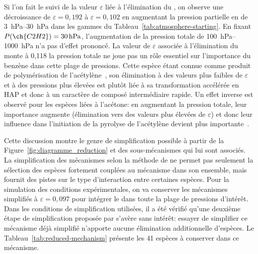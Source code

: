 Si l'on fait le suivi de la valeur $\varepsilon$ liée à l'élimination du , on observe une décroissance de $\varepsilon=0,192$ à $\varepsilon=0,102$ en augmentant la pression partielle en  de \SIrange{3}{30}{\hecto\pascal} dans les gammes du Tableau~\ref{tab:atmosphere-starting}. En fixant $P(\ch{C2H2})=\SI{30}{\hecto\pascal}$, l'augmentation de la pression totale de \SIrange{100}{1000}{\hecto\pascal} n'a pas d'effet prononcé. La valeur de $\varepsilon$ associée à l'élimination du  monte à 0,118 \textemdash{} la pression totale ne joue pas un rôle essentiel sur l'importance du benzène dans cette plage de pressions. Cette espèce étant connue comme produit de polymérisation de l'acétylène~\cite{Norinaga2005}, son élimination à des valeurs plus faibles de $\varepsilon$ et à des pressions plus élevées est plutôt liée à sa transformation accélérée en HAP et donc à un caractère de composé intermédiaire rapide. Un effet inverse est observé pour les espèces liées à l'acétone: en augmentant la pression totale, leur importance augmente (élimination vers des valeurs plus élevées de $\varepsilon$) et donc leur influence dans l'initiation de la pyrolyse de l'acétylène devient plus importante~\cite{Norinaga2007}.

Cette discussion montre le genre de simplification possible à partir de la Figure~\ref{fig:diagramme_reduction} et des sous-mécanismes qui lui sont associés. La simplification des mécanismes selon la méthode de \citet{Lu2005} ne permet pas seulement la sélection des espèces fortement couplées au mécanisme dans son ensemble, mais fournit des pistes sur le type d'interaction entre certaines espèces. Pour la simulation des conditions expérimentales, on va conserver les mécanismes simplifiés à $\varepsilon=0,097$ pour intégrer le  dans toute la plage de pressions d'intérêt. Dans les conditions de simplification utilisées, il a été vérifié qu'une deuxième étape de simplification proposée par \citet{Lu2005} s'avère sans intérêt: essayer de simplifier ce mécanisme déjà simplifié n'apporte aucune élimination additionnelle d'espèces. Le Tableau~\ref{tab:reduced-mechanism} présente les 41 espèces à conserver dans ce mécanisme.%

